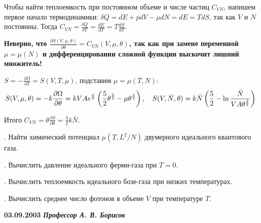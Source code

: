\documentclass[a4paper,12pt]{article}
\begin{document}
Чтобы найти теплоемкость при постоянном объеме и числе частиц $C_{VN}$, напишем
первое начало термодинамики: $\delta Q=dE+pdV-\mu dN=dE=TdS$, так как $V$ и $N$
постоянны. Тогда $C_{VN}=\frac{\delta Q}{\delta T}=\frac{dE}{dT}=T\frac{dS}{dT}$.

\noindent\llap{!!! }\textbf{Неверно, что
  $\frac{\partial S(V,\mu,\theta)}{\partial\theta}=C_{VN}(V,\mu,\theta)$,
  так как при замене переменной $\mu=\mu(N)$ и дифференцировании сложной
  функции выскочит лишний множитель!}

$S=-\frac{\partial\Omega}{\partial T}=S(V,T,\mu)$, подставим $\mu=\mu(T,N)$:
$$
  S(V,\mu,\theta)=-k\frac{\partial\Omega}{\partial\theta}=
    kVAe^{\frac\mu\theta}
      \left(\frac52\theta^{\frac32}-\mu\theta^{\frac12}\right),
\mbox{\quad}
  S(V,\bar N,\theta)=k\bar N
    \left(\frac52-\ln\frac{\bar N}{VA\theta^{\frac32}}\right)
$$

Итого $C_{VN}=\theta\frac{\partial S}{\partial\theta}=\frac32k\bar N$.

. Найти химический потенциал $\mu \left( {T,L^2 / N}
\right)$ двумерного идеального квантового газа.

. Вычислить давление идеального ферми-газа при $T =
0$.

. Вычислить теплоемкость идеального бозе-газа при
низких температурах.

. Вычислить среднее число фотонов в объеме $V$ при
температуре $T$.


\bigskip

\textbf{03.09.2003}
  \hfill\textbf{\textit{Профессор\hspace{2cm} А. В. Борисов}}
\end{document}
